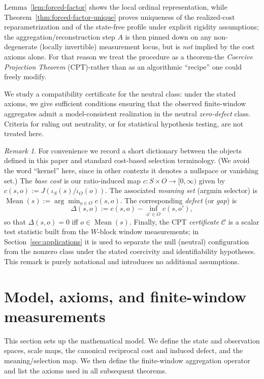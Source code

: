 \documentclass[11pt,reqno]{amsart}
\theoremstyle{definition}
\theoremstyle{remark}
\newtheorem{remark}[theorem]{Remark} %
\newcommand{\1}{\mathbf{1}}
\newcommand{\Mean}{\operatorname{Mean}}
\begin{document}
Lemma~\ref{lem:forced-factor} shows the local ordinal representation, while Theorem~\ref{thm:forced-factor-unique} proves uniqueness of the realized-cost reparametrization and of the state-free profile under explicit rigidity assumptions; the aggregation/reconstruction step $A$ is then pinned down on any non-degenerate (locally invertible) measurement locus, but is \emph{not} implied by the cost axioms alone. For that reason we treat
the procedure as a theorem-the \emph{Coercive Projection Theorem} (CPT)-rather than as an
algorithmic ``recipe'' one could freely modify.

We study a compatibility certificate for the neutral class: under the stated axioms, we give sufficient conditions ensuring that the observed finite-window aggregates admit a model-consistent realization in the neutral \emph{zero-defect} class. Criteria for ruling out neutrality, or for statistical hypothesis testing, are not treated here.

\begin{remark}\label{rem:kernel-dict}
For convenience we record a short dictionary between the objects defined in this paper and standard cost-based selection terminology. (We avoid the word ``kernel'' here, since in other contexts it denotes a nullspace or vanishing set.) The \emph{base cost} is our ratio-induced map $c:S\times O\to[0,\infty)$ given by $c(s,o):=J(\iota_S(s)/\iota_O(o))$. The associated \emph{meaning set} (argmin selector) is $\Mean(s):=\arg\min_{o\in O} c(s,o)$. The corresponding \emph{defect} (or \emph{gap}) is
\[
\Delta(s,o):=c(s,o)-\inf_{o'\in O}c(s,o'),
\]
so that $\Delta(s,o)=0$ iff $o\in\Mean(s)$. Finally, the CPT \emph{certificate} $\mathcal{C}$ is a scalar test statistic built from the $W$-block window measurements; in Section~\ref{sec:applications} it is used to separate the null (neutral) configuration from the nonzero class under the stated coercivity and identifiability hypotheses. This remark is purely notational and introduces no additional assumptions.
\end{remark}

\section{Model, axioms, and finite-window measurements}\label{sec:axioms}

This section sets up the mathematical model. We define the state and observation spaces, scale maps, the canonical reciprocal cost and induced defect, and the meaning/selection map. We then define the finite-window aggregation operator and list the axioms used in all subsequent theorems.
\end{document}
